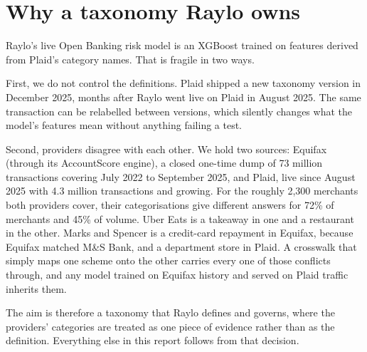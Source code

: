 \section{Why a taxonomy Raylo owns}
Raylo's live Open Banking risk model is an XGBoost trained on features derived from Plaid's category names. That is fragile in two ways.

First, we do not control the definitions. Plaid shipped a new taxonomy version in December 2025, months after Raylo went live on Plaid in August 2025. The same transaction can be relabelled between versions, which silently changes what the model's features mean without anything failing a test.

Second, providers disagree with each other. We hold two sources: Equifax (through its AccountScore engine), a closed one-time dump of 73 million transactions covering July 2022 to September 2025, and Plaid, live since August 2025 with 4.3 million transactions and growing. For the roughly 2,300 merchants both providers cover, their categorisations give different answers for 72\% of merchants and 45\% of volume. Uber Eats is a takeaway in one and a restaurant in the other. Marks and Spencer is a credit-card repayment in Equifax, because Equifax matched M\&S Bank, and a department store in Plaid. A crosswalk that simply maps one scheme onto the other carries every one of those conflicts through, and any model trained on Equifax history and served on Plaid traffic inherits them.

The aim is therefore a taxonomy that Raylo defines and governs, where the providers' categories are treated as one piece of evidence rather than as the definition. Everything else in this report follows from that decision.

